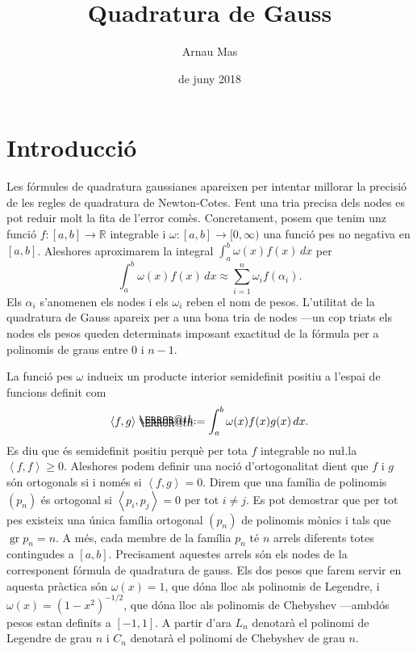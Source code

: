 \documentclass[12pt]{article}
\title{\sffamily {\bfseries Pràctica 4:} Quadratura de Gauss}
\author{\sffamily Arnau Mas}
\date{\sffamily 6 de juny 2018}
\makeatletter
\numberwithin{table}{section}
\numberwithin{figure}{section}
\numberwithin{equation}{section}
\newcommand{\R}{\mathbb{R}}
\DeclareMathOperator{\gr}{gr}
\newcommand{\inn}[2]{\left\langle #1 , #2 \right\rangle}
\newcommand*{\defeq}{\mathrel{\rlap{%
    \raisebox{0.3ex}{$\m@th\cdot$}}%
  \raisebox{-0.3ex}{$\m@th\cdot$}}%
=}
\makeatother
\begin{document}
\maketitle

\section{Introducció}
Les fórmules de quadratura gaussianes apareixen per intentar millorar la precisió de les regles de quadratura de Newton-Cotes. Fent una tria precisa dels nodes es pot reduir molt la fita de l'error comès. Concretament, posem que tenim unz funció \( f \colon [a,b] \longrightarrow \R \) integrable i \( \omega \colon [a,b] \longrightarrow [0, \infty) \) una funció pes no negativa en \( [a,b] \). Aleshores aproximarem la integral \( \int_a^b \omega(x)f(x) \, dx \) per
\begin{equation*}
 	\int_a^b \omega(x)f(x) \, dx \approx \sum_{i = 1}^n \omega_i f(\alpha_i). 
\end{equation*}
Els \( \alpha_i \) s'anomenen els nodes i els \( \omega_i \) reben el nom de pesos. L'utilitat de la quadratura de Gauss apareix per a una bona tria de nodes ---un cop triats els nodes els pesos queden determinats imposant exactitud de la fórmula per a polinomis de graus entre 0 i \( n-1 \).  

La funció pes \( \omega \) indueix un producte interior semidefinit positiu a l'espai de funcions definit com
\begin{equation*}
	\inn{f}{g} \defeq \int_a^b \omega(x) f(x) g(x) \, dx.
\end{equation*}
Es diu que és semidefinit positiu perquè per tota \( f \) integrable no nu\l.la \( \inn{f}{f} \geq 0 \). Aleshores podem definir una noció d'ortogonalitat dient que \( f \) i \( g \) són ortogonals si i només si \( \inn{f}{g} = 0 \). Direm que una família de polinomis \( (p_n) \) és ortogonal si \( \inn{p_i}{p_j} = 0 \) per tot \( i \neq j \). Es pot demostrar que per tot pes existeix una única família ortogonal \( (p_n) \) de polinomis mònics i tals que \( \gr p_n = n \). A més, cada membre de la família \( p_n \) té \( n \) arrels diferents totes contingudes a \( [a,b] \). Precisament aquestes arrels són els nodes de la corresponent fórmula de quadratura de gauss. Els dos pesos que farem servir en aquesta pràctica són \( \omega(x) = 1 \), que dóna lloc als polinomis de Legendre, i \( \omega(x) = (1 - x^2)^{-1/2} \), que dóna lloc als polinomis de Chebyshev ---ambdós pesos estan definits a \( [-1,1] \). A partir d'ara \( L_n \) denotarà el polinomi de Legendre de grau \( n \) i \( C_n \) denotarà el polinomi de Chebyshev de grau \( n \). 
\end{document}

